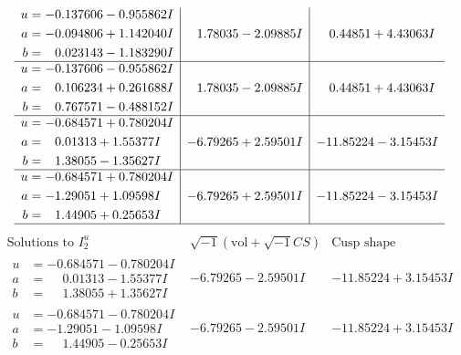 \documentclass[1p]{elsarticle_modified}
\theoremstyle{definition}
\newcommand{\I}{\sqrt{-1}}
\begin{document}
$$\begin{array}{c|c|c}
\begin{aligned}
u &= -0.137606 - 0.955862 I \\
a &= -0.094806 + 1.142040 I \\
b &= \phantom{-}0.023143 - 1.183290 I\end{aligned}
 & \phantom{-}1.78035 - 2.09885 I & \phantom{-}0.44851 + 4.43063 I \\ \hline\begin{aligned}
u &= -0.137606 - 0.955862 I \\
a &= \phantom{-}0.106234 + 0.261688 I \\
b &= \phantom{-}0.767571 - 0.488152 I\end{aligned}
 & \phantom{-}1.78035 - 2.09885 I & \phantom{-}0.44851 + 4.43063 I \\ \hline\begin{aligned}
u &= -0.684571 + 0.780204 I \\
a &= \phantom{-}0.01313 + 1.55377 I \\
b &= \phantom{-}1.38055 - 1.35627 I\end{aligned}
 & -6.79265 + 2.59501 I & -11.85224 - 3.15453 I \\ \hline\begin{aligned}
u &= -0.684571 + 0.780204 I \\
a &= -1.29051 + 1.09598 I \\
b &= \phantom{-}1.44905 + 0.25653 I\end{aligned}
 & -6.79265 + 2.59501 I & -11.85224 - 3.15453 I\\
 \hline 
 \end{array}$$\newpage$$\begin{array}{c|c|c}  
\text{Solutions to }I^u_{2}& \I (\text{vol} + \sqrt{-1}CS) & \text{Cusp shape}\\
 \hline 
\begin{aligned}
u &= -0.684571 - 0.780204 I \\
a &= \phantom{-}0.01313 - 1.55377 I \\
b &= \phantom{-}1.38055 + 1.35627 I\end{aligned}
 & -6.79265 - 2.59501 I & -11.85224 + 3.15453 I \\ \hline\begin{aligned}
u &= -0.684571 - 0.780204 I \\
a &= -1.29051 - 1.09598 I \\
b &= \phantom{-}1.44905 - 0.25653 I\end{aligned}
 & -6.79265 - 2.59501 I & -11.85224 + 3.15453 I \\ \hline\begin{aligned}

\end{aligned}
\end{array}$$
\end{document}

